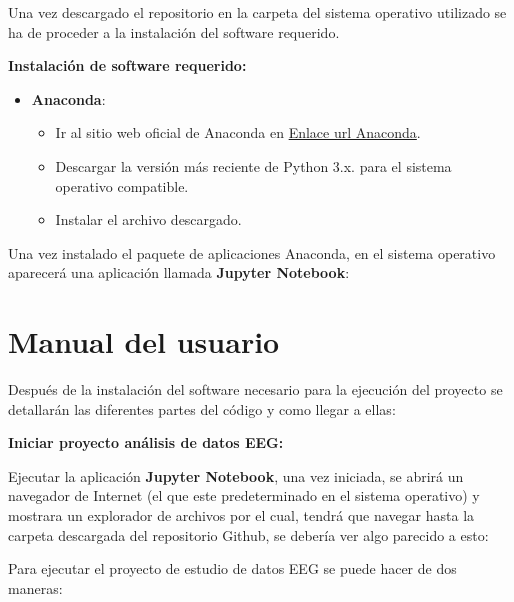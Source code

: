 Una vez descargado el repositorio en la carpeta del sistema operativo utilizado se ha de proceder a la instalación del software requerido. 

\textbf{Instalación de software requerido:} 
  \begin{itemize}
   \tightlist
   \item
    \textbf{Anaconda}: 
    \begin{itemize}
   \tightlist
   \item
    Ir al sitio web oficial de Anaconda en \href{https://www.anaconda.com/download/success}{Enlace url Anaconda}. 
   \item
    Descargar la versión más reciente de Python 3.x. para el sistema operativo compatible.
   \item
   Instalar el archivo descargado.
   \end{itemize}
  \end{itemize}  


Una vez instalado el paquete de aplicaciones Anaconda, en el sistema operativo aparecerá una aplicación llamada \textbf{Jupyter Notebook}:





\section{Manual del usuario}


Después de la instalación del software necesario para la ejecución del proyecto se detallarán las diferentes partes del código y como llegar a ellas:


\textbf{Iniciar proyecto análisis de datos EEG:}

Ejecutar la aplicación \textbf{Jupyter Notebook}, una vez iniciada, se abrirá un navegador de Internet (el que este predeterminado en el sistema operativo) y mostrara un explorador de archivos por el cual, tendrá que navegar hasta la carpeta descargada del repositorio Github, se debería ver algo parecido a esto:




Para ejecutar el proyecto de estudio de datos EEG se puede hacer de dos maneras:

